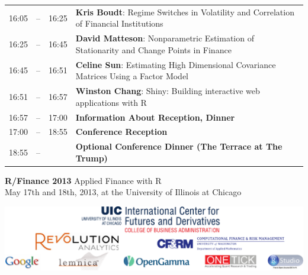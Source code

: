 \begin{tabular}{rlrp{6.1in}}
16:05&\color{Breaks}--\hspace{-10ex}& 16:25&\textbf{\color{Talk} Kris Boudt}: \small{Regime Switches in Volatility and Correlation of Financial Institutions} \\
16:25&\color{Breaks}--\hspace{-10ex}& 16:45&\textbf{\color{Talk} David Matteson}: \small{Nonparametric Estimation of Stationarity and Change Points in Finance} \\
16:45&\color{Breaks}--\hspace{-10ex}& 16:51&\textbf{\color{LightningTalk} Celine Sun}: \small{Estimating High Dimensional Covariance Matrices Using a Factor Model} \\
16:51&\color{Breaks}--\hspace{-10ex}& 16:57&\textbf{\color{LightningTalk} Winston Chang}: \small{Shiny: Building interactive web applications with R} \\
16:57&\color{Breaks}--\hspace{-10ex}& 17:00&\textbf{\color{Breaks} Information About Reception, Dinner} \\
17:00&\color{Breaks}--\hspace{-10ex}& 18:55&\textbf{\color{Breaks} Conference Reception} \\
18:55&\color{Breaks}--\hspace{-10ex}& &\textbf{\color{Breaks} Optional Conference Dinner (The Terrace at The Trump)} \\[12pt]
\end{tabular}

\clearpage

{\Huge \textbf{\color{KeynoteTalk} R/Finance 2013} \huge \phantom{i} Applied Finance with R} \\
{\large \color{Breaks} May 17th and 18th, 2013, at the University of Illinois at Chicago} \\
\vspace{3ex}
\hrulefill
\vspace{-2ex}
\begin{center}
\includegraphics[scale=0.8]{sponsors.pdf}
\end{center}
\vspace{-3ex}
\hrulefill

